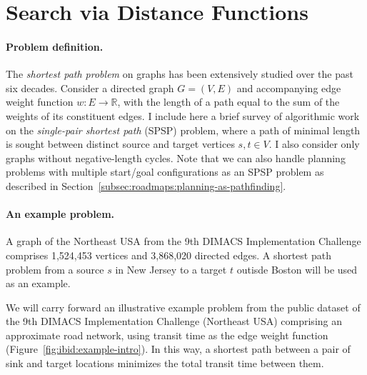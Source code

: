 \section{Search via Distance Functions}
\label{sec:ibid:distance-functions}

\paragraph{Problem definition.}
The \emph{shortest path problem} on graphs has been extensively
studied over the past six decades.
Consider a directed graph $G = (V,E)$ and accompanying edge weight
function $w : E \rightarrow \mathbb{R}$,
with the length of a path equal to the sum of the weights of its
constituent edges.
I include here a brief survey of algorithmic work on the
\emph{single-pair shortest path} (SPSP) problem,
where a path of minimal length is sought
between distinct source and target vertices
$s,t \in V$.
I also consider only graphs without negative-length cycles.
Note that we can also handle planning problems with multiple
start/goal configurations as an SPSP problem
as described in Section~\ref{subsec:roadmaps:planning-as-pathfinding}.

\paragraph{An example problem.}
\begin{marginfigure}%
   \centering%
   \caption{A graph of the Northeast USA from the 9th DIMACS
      Implementation Challenge
      comprises 1,524,453 vertices and 3,868,020 directed edges.
      A shortest path problem from a source $s$ in New Jersey
      to a target $t$ outisde Boston
      will be used as an example.}%
   \label{fig:ibid:example-intro}%
\end{marginfigure}
We will carry forward an illustrative example problem from
the public dataset of the 9th DIMACS Implementation Challenge
\citep{demetrescuetal2006dimacs9}
(Northeast USA)
comprising an approximate road network,
using transit time as the edge weight function
(Figure~\ref{fig:ibid:example-intro}).
In this way,
a shortest path between a pair of sink and target locations
minimizes the total transit time between them.

